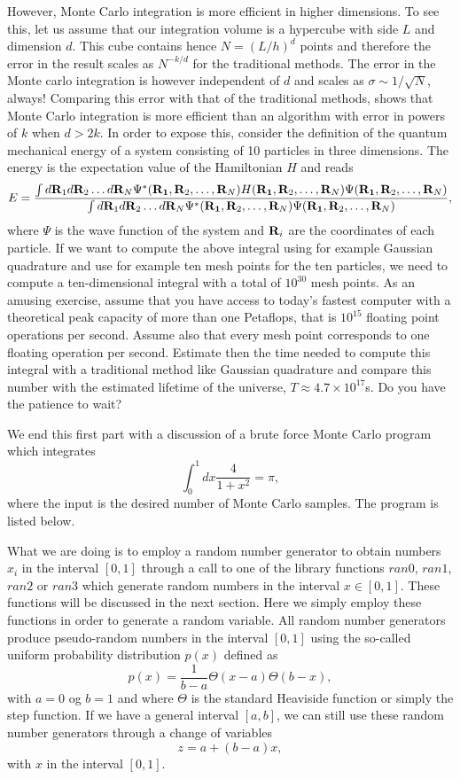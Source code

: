 However, Monte Carlo integration is more efficient in higher dimensions.
To see this, let us assume that our integration volume is a hypercube 
with side $L$ and dimension $d$. This cube contains hence 
$N=(L/h)^d$ points and therefore the error in the result scales as
$N^{-k/d}$ for the traditional methods. The error in the Monte carlo integration is 
however independent of $d$ and scales as $\sigma\sim 1/\sqrt{N}$, always! Comparing
this error with that of the traditional methods, shows that
Monte Carlo integration is more efficient than an  algorithm with error in powers of $k$
when $d>2k$. 
In order to expose this, consider the definition of the quantum mechanical energy
of a system consisting of 10 particles in three dimensions. The energy is the expectation value 
of the Hamiltonian $H$ and reads
 \[
    E=\frac{\int d{\bf R}_1d{\bf R}_2\dots d{\bf R}_N
          \Psi^{\ast}({\bf R_1},{\bf R}_2,\dots,{\bf R}_N)
           H({\bf R_1},{\bf R}_2,\dots,{\bf R}_N)
           \Psi({\bf R_1},{\bf R}_2,\dots,{\bf R}_N)}
         {\int d{\bf R}_1d{\bf R}_2\dots d{\bf R}_N
         \Psi^{\ast}({\bf R_1},{\bf R}_2,\dots,{\bf R}_N)
         \Psi({\bf R_1},{\bf R}_2,\dots,{\bf R}_N)},
 \]
where $\Psi$ is the wave function of the system and ${\bf R}_i$ are the coordinates
of each particle. If we want to compute the above integral 
using for example Gaussian quadrature and use for example ten mesh
points for the ten particles, we need to compute a ten-dimensional integral with a total of $10^{30}$ mesh points.
As an amusing exercise, assume that you have access to today's fastest computer with a theoretical peak 
capacity of more than one Petaflops, that is $10^{15}$ floating point operations per second. Assume also that every mesh point
corresponds to one floating operation per second. Estimate then the time needed to compute this integral with
a traditional method like Gaussian quadrature and compare this number with the estimated lifetime of the
universe, $T\approx 4.7 \times
10^{17}$s. Do you have the patience to wait?

We end this first part with a discussion of 
a brute force Monte Carlo program which integrates 
\[
   \int_0^1dx\frac{4}{1+x^2} = \pi,
\]
where the input is the desired number of Monte Carlo samples. The program is listed below.


What we are doing is to employ a random number generator to obtain numbers
$x_i$ in the interval $[0,1]$ through a call to one of the 
library functions
$ran0$, $ran1$, $ran2$ or $ran3$ which generate random numbers in the 
interval $x\in [0,1]$. 
These functions will be discussed in the next section. 
Here we simply employ these functions in order
to generate a random variable.
All random number generators produce pseudo-random  
numbers in the interval $[0,1]$ using the so-called uniform
probability distribution  
$p(x)$ defined as 
\[
  p(x)=\frac{1}{b-a}\Theta(x-a)\Theta(b-x),
\]
with  $a=0$ og $b=1$ and where $\Theta$ is the standard Heaviside 
function or simply the step function.
If we have a general  interval  $[a,b]$, we can still
use these random number generators through a change of variables 
\[
   z=a+(b-a)x,
\]
with $x$ in the interval 
$[0,1]$. 



